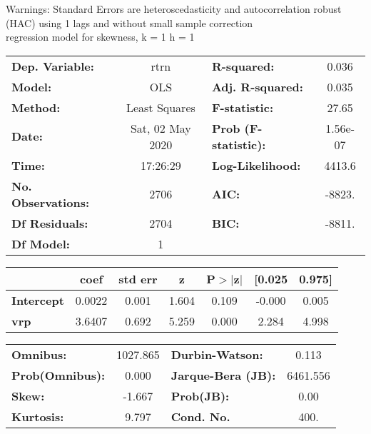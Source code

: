 Warnings: \newline
 [1] Standard Errors are heteroscedasticity and autocorrelation robust (HAC) using 1 lags and without small sample correction\\ 

regression model for skewness, k = 1 h = 1\begin{center}
\begin{tabular}{lclc}
\toprule
\textbf{Dep. Variable:}    &       rtrn       & \textbf{  R-squared:         } &     0.036   \\
\textbf{Model:}            &       OLS        & \textbf{  Adj. R-squared:    } &     0.035   \\
\textbf{Method:}           &  Least Squares   & \textbf{  F-statistic:       } &     27.65   \\
\textbf{Date:}             & Sat, 02 May 2020 & \textbf{  Prob (F-statistic):} &  1.56e-07   \\
\textbf{Time:}             &     17:26:29     & \textbf{  Log-Likelihood:    } &    4413.6   \\
\textbf{No. Observations:} &        2706      & \textbf{  AIC:               } &    -8823.   \\
\textbf{Df Residuals:}     &        2704      & \textbf{  BIC:               } &    -8811.   \\
\textbf{Df Model:}         &           1      & \textbf{                     } &             \\
\bottomrule
\end{tabular}
\begin{tabular}{lcccccc}
                   & \textbf{coef} & \textbf{std err} & \textbf{z} & \textbf{P$> |$z$|$} & \textbf{[0.025} & \textbf{0.975]}  \\
\midrule
\textbf{Intercept} &       0.0022  &        0.001     &     1.604  &         0.109        &       -0.000    &        0.005     \\
\textbf{vrp}       &       3.6407  &        0.692     &     5.259  &         0.000        &        2.284    &        4.998     \\
\bottomrule
\end{tabular}
\begin{tabular}{lclc}
\textbf{Omnibus:}       & 1027.865 & \textbf{  Durbin-Watson:     } &    0.113  \\
\textbf{Prob(Omnibus):} &   0.000  & \textbf{  Jarque-Bera (JB):  } & 6461.556  \\
\textbf{Skew:}          &  -1.667  & \textbf{  Prob(JB):          } &     0.00  \\
\textbf{Kurtosis:}      &   9.797  & \textbf{  Cond. No.          } &     400.  \\
\bottomrule
\end{tabular}
\end{center}

